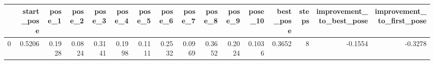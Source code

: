\begin{tabular}{lrrrrrrrrrrrrrrr}
\toprule
{} &  start\_pose &  pose\_1 &  pose\_2 &  pose\_3 &  pose\_4 &  pose\_5 &  pose\_6 &  pose\_7 &  pose\_8 &  pose\_9 &  pose\_10 &  best\_pose &  steps &  improvement\_to\_best\_pose &  improvement\_to\_first\_pose \\
\midrule
0 &      0.5206 &  0.1928 &  0.0824 &  0.3141 &  0.1998 &  0.1111 &  0.2532 &  0.0969 &  0.3652 &  0.2024 &   0.1036 &     0.3652 &      8 &                   -0.1554 &                    -0.3278 \\
\bottomrule
\end{tabular}
